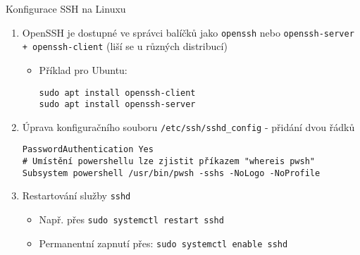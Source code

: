 \documentclass[main.tex]{subfiles}
\begin{document}
\begin{frame}{Konfigurace SSH na Linuxu}
\begin{enumerate}
  \item OpenSSH je dostupné ve správci balíčků jako \texttt{openssh} nebo \texttt{openssh-server + openssh-client} (liší se u různých distribucí)
    \begin{itemize}
      \item Příklad pro Ubuntu:
    \begin{verbatim}
sudo apt install openssh-client
sudo apt install openssh-server
    \end{verbatim}
\end{itemize}
\item Úprava konfiguračního souboru \texttt{/etc/ssh/sshd\_config} - přidání dvou řádků
  \begin{verbatim}
PasswordAuthentication Yes
# Umístění powershellu lze zjistit příkazem "whereis pwsh"
Subsystem powershell /usr/bin/pwsh -sshs -NoLogo -NoProfile\end{verbatim}


\item Restartování služby \texttt{sshd}
  \begin{itemize}
    \item Např. přes \texttt{sudo systemctl restart sshd}
    \item Permanentní zapnutí přes: \texttt{sudo systemctl enable sshd}
  \end{itemize}
\end{enumerate}
\end{frame}
\end{document}

